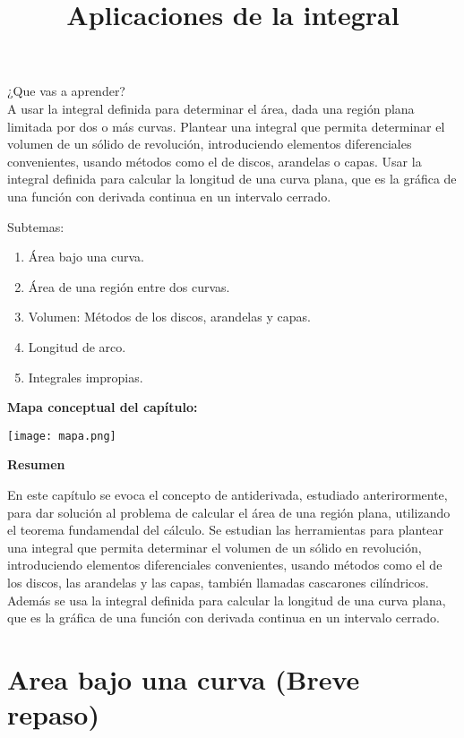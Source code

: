 \documentclass{SBCbookchapter}
\title{Aplicaciones de la integral}
\begin{document}
\maketitle


\parbox{70mm}{¿Que vas a aprender?\\A usar la integral definida para determinar el área, dada una región plana limitada por dos o más curvas. Plantear una integral que permita determinar el volumen de un sólido de revolución, introduciendo elementos diferenciales convenientes, usando métodos como el de discos, arandelas o capas.
Usar la integral definida para calcular la longitud de una curva plana, que es la gráfica de una función con derivada continua en un intervalo cerrado.}
\hfill
\parbox{50mm}{Subtemas:
\begin{enumerate}
    \item Área bajo una curva.
    \item Área de una región entre dos curvas.
    \item Volumen: Métodos de los discos, arandelas y  capas.
    \item Longitud de arco.
    \item Integrales impropias.
\end{enumerate}}

\textbf{Mapa conceptual del capítulo:}
\begin{center}
    \texttt{[image: mapa.png]}
\end{center}
\begin{center}
    \textbf{Resumen}
\end{center}
En este capítulo se evoca el concepto de antiderivada, estudiado anterirormente, para dar solución al problema de calcular el área de una región plana, utilizando el teorema fundamendal del cálculo.
Se estudian las herramientas para plantear una integral que permita determinar el volumen de un sólido en revolución, introduciendo elementos diferenciales convenientes, usando métodos como el de los discos, las arandelas y las capas, también llamadas cascarones cilíndricos.
Además se usa la integral definida para calcular la longitud de una curva plana, que es la gráfica de una función con derivada continua en un intervalo cerrado.

\section{Area bajo una curva (Breve repaso)}

\usepackage{multirow}
\end{document}
